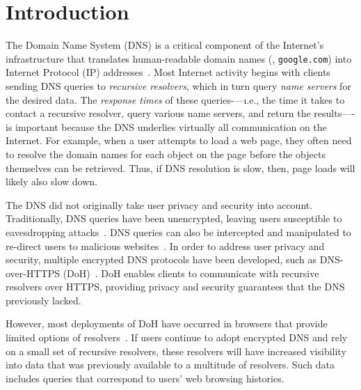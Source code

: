 \section{Introduction}\label{sec:intro}
The Domain Name System (DNS) is a critical component of the Internet's infrastructure that translates human-readable domain names (\eg, \texttt{google.com}) into Internet Protocol (IP) addresses~\cite{dns-rfcs}.
Most Internet activity begins with clients sending DNS queries to \emph{recursive resolvers}, which in turn query \emph{name servers} for the desired data.
The \emph{response times} of these queries-—\i.e., the time it takes to contact a recursive resolver, query various name servers, and return the results—-is important because the DNS underlies virtually all communication on the Internet.
For example, when a user attempts to load a web page, they often need to resolve the domain names for each object on the page before the objects themselves can be retrieved.
Thus, if DNS resolution is slow, then, page loads will likely also slow down.

The DNS did not originally take user privacy and security into account.
Traditionally, DNS queries have been unencrypted, leaving users susceptible to eavesdropping attacks~\cite{dns-eavesdrop}.
DNS queries can also be intercepted and manipulated to re-direct users to malicious websites~\cite{dns-redirect}.
In order to address user privacy and security, multiple encrypted DNS protocols have been developed, such as DNS-over-HTTPS (DoH)~\cite{rfc8484}.
DoH enables clients to communicate with recursive resolvers over HTTPS, providing privacy and security guarantees that the DNS previously lacked.

However, most deployments of DoH have occurred in browsers that provide limited options of resolvers~\cite{ffChoices,chromeResolvers}.
If users continue to adopt encrypted DNS and rely on a small set of recursive resolvers, these resolvers will have increased visibility into data that was previously available to a multitude of resolvers.
Such data includes queries that correspond to users' web browsing histories.

